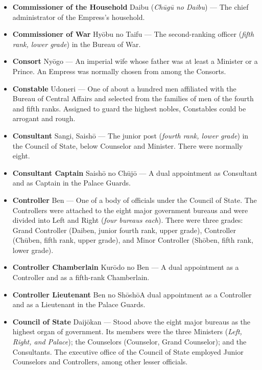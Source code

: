 \documentclass{article}
\begin{document}
\begin{multicols}{2}
\begin{small}
\begin{itemize}[
				label=,
				leftmargin=0em,
				rightmargin=-1.5em,
				itemindent=-2em,
			]
			\item \textbf{Commissioner of the Household} Daibu (\textit{Chūgū no Daibu}) --- The chief administrator of the Empress's household.

			\item \textbf{Commissioner of War} Hyōbu no Taifu --- The second-ranking officer (\textit{fifth rank, lower grade}) in the Bureau of War.

			\item \textbf{Consort} Nyōgo --- An imperial wife whose father was at least a Minister or a Prince. An Empress was normally chosen from among the Consorts.

			\item \textbf{Constable} Udoneri --- One of about a hundred men affiliated with the Bureau of Central Affairs and selected from the families of men of the fourth and fifth ranks. Assigned to guard the highest nobles, Constables could be arrogant and rough.

			\item \textbf{Consultant} Sangi, Saishō --- The junior post (\textit{fourth rank, lower grade}) in the Council of State, below Counselor and Minister. There were normally eight.

			\item \textbf{Consultant Captain} Saishō no Chūjō --- A dual appointment as Consultant and as Captain in the Palace Guards.

			\item \textbf{Controller} Ben --- One of a body of officials under the Council of State. The Controllers were attached to the eight major government bureaus and were divided into Left and Right (\textit{four bureaus each}). There were three grades: Grand Controller (Daiben, junior fourth rank, upper grade), Controller (Chūben, fifth rank, upper grade), and Minor Controller (Shōben, fifth rank, lower grade).

			\item \textbf{Controller Chamberlain} Kurōdo no Ben --- A dual appointment as a Controller and as a fifth-rank Chamberlain.

			\item \textbf{Controller Lieutenant} Ben no ShōshōA dual appointment as a Controller and as a Lieutenant in the Palace Guards.

			\item \textbf{Council of State} Daijōkan --- Stood above the eight major bureaus as the highest organ of government. Its members were the three Ministers (\textit{Left, Right, and Palace}); the Counselors (Counselor, Grand Counselor); and the Consultants. The executive office of the Council of State employed Junior Counselors and Controllers, among other lesser officials.


\end{itemize}
\end{small}
\end{multicols}
\end{document}
